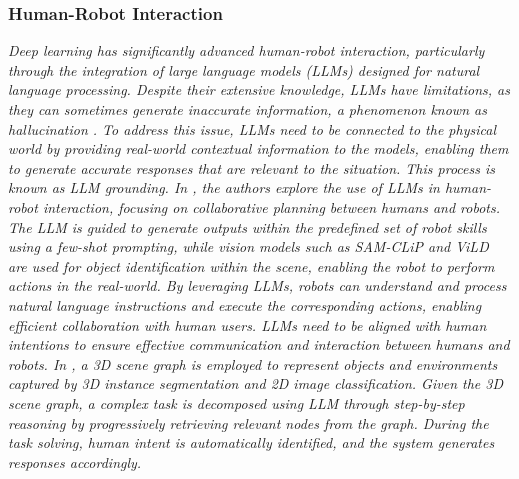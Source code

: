 \documentclass[preprint,12pt]{elsarticle}
\begin{document}
\subsubsection{Human-Robot Interaction}
\emph{Deep learning has significantly advanced human-robot interaction, particularly through the integration of large language models (LLMs) designed for natural language processing. Despite their extensive knowledge, LLMs have limitations, as they can sometimes generate inaccurate information, a phenomenon known as hallucination \citep{huang_survey_2025}. To address this issue, LLMs need to be connected to the physical world by providing real-world contextual information to the models, enabling them to generate accurate responses that are relevant to the situation. This process is known as LLM grounding. In \citep{asuzu_humanrobot_2025}, the authors explore the use of LLMs in human-robot interaction, focusing on collaborative planning between humans and robots. The LLM is guided to generate outputs within the predefined set of robot skills using a few-shot prompting, while vision models such as SAM-CLiP and ViLD are used for object identification within the scene, enabling the robot to perform actions in the real-world. By leveraging LLMs, robots can understand and process natural language instructions and execute the corresponding actions, enabling efficient collaboration with human users. LLMs need to be aligned with human intentions to ensure effective communication and interaction between humans and robots. In \citep{chen_synergai_2024}, a 3D scene graph is employed to represent objects and environments captured by 3D instance segmentation and 2D image classification. Given the 3D scene graph, a complex task is decomposed using LLM through step-by-step reasoning by progressively retrieving relevant nodes from the graph. During the task solving, human intent is automatically identified, and the system generates responses accordingly.}
\end{document}

